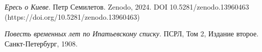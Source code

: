 \emph{Ересь о Киеве}. Петр Семилетов. Zenodo, 2024. DOI 10.5281/zenodo.13960463 (https://doi.org/10.5281/zenodo.13960463)

\emph{Повесть временных лет по Ипатьевскому списку}. ПСРЛ, Том 2, Издание второе. Санкт-Петербург, 1908. 

